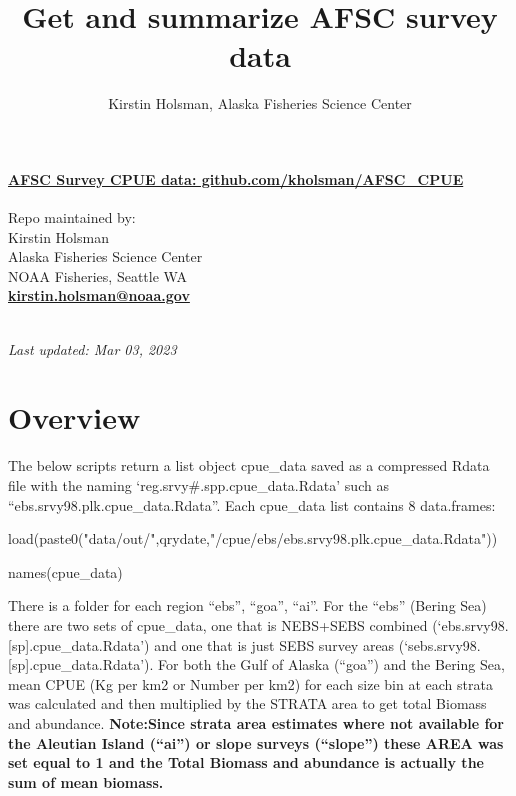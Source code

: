 \documentclass[
]{article}
\title{Get and summarize AFSC survey data}
\author{Kirstin Holsman, Alaska Fisheries Science Center}
\date{}
\newenvironment{Shaded}{\begin{snugshade}}{\end{snugshade}}
\newcommand{\FunctionTok}[1]{\textcolor[rgb]{0.00,0.00,0.00}{#1}}
\newcommand{\NormalTok}[1]{#1}
\newcommand{\StringTok}[1]{\textcolor[rgb]{0.31,0.60,0.02}{#1}}
\begin{document}
\maketitle

{
\setcounter{tocdepth}{2}
\tableofcontents
}
\hypertarget{afsc-survey-cpue-data-github.comkholsmanafsc_cpue}{%
\paragraph{\texorpdfstring{\href{https://github.com/kholsman/AFSC_CPUE}{\textbf{AFSC
Survey CPUE data:
github.com/kholsman/AFSC\_CPUE}}}{AFSC Survey CPUE data: github.com/kholsman/AFSC\_CPUE}}\label{afsc-survey-cpue-data-github.comkholsmanafsc_cpue}}

Repo maintained by:\\
Kirstin Holsman\\
Alaska Fisheries Science Center\\
NOAA Fisheries, Seattle WA\\
\textbf{\url{kirstin.holsman@noaa.gov}}\strut \\
\emph{Last updated: Mar 03, 2023}

\hypertarget{overview}{%
\section{Overview}\label{overview}}

The below scripts return a list object cpue\_data saved as a compressed
Rdata file with the naming `reg.srvy\#.spp.cpue\_data.Rdata' such as
``ebs.srvy98.plk.cpue\_data.Rdata''. Each cpue\_data list contains 8
data.frames:

\begin{Shaded}
\begin{Highlighting}[]
\FunctionTok{load}\NormalTok{(}\FunctionTok{paste0}\NormalTok{(}\StringTok{"data/out/"}\NormalTok{,qrydate,}\StringTok{"/cpue/ebs/ebs.srvy98.plk.cpue\_data.Rdata"}\NormalTok{))}

\FunctionTok{names}\NormalTok{(cpue\_data)}
\end{Highlighting}
\end{Shaded}

There is a folder for each region ``ebs'', ``goa'', ``ai''. For the
``ebs'' (Bering Sea) there are two sets of cpue\_data, one that is
NEBS+SEBS combined (`ebs.srvy98.{[}sp{]}.cpue\_data.Rdata') and one that
is just SEBS survey areas (`sebs.srvy98.{[}sp{]}.cpue\_data.Rdata'). For
both the Gulf of Alaska (``goa'') and the Bering Sea, mean CPUE (Kg per
km2 or Number per km2) for each size bin at each strata was calculated
and then multiplied by the STRATA area to get total Biomass and
abundance. \textbf{Note:Since strata area estimates where not available
for the Aleutian Island (``ai'') or slope surveys (``slope'') these AREA
was set equal to 1 and the Total Biomass and abundance is actually the
sum of mean biomass. }
\end{document}
